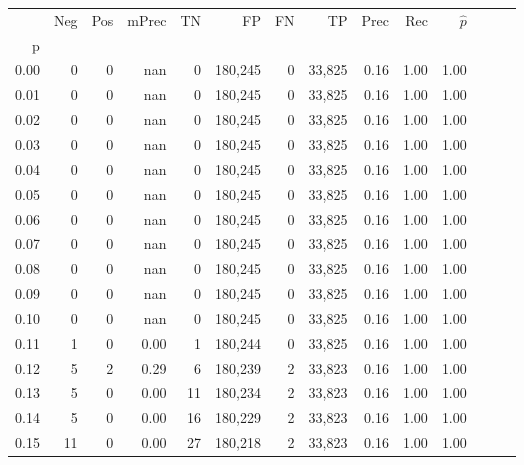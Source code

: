 \begin{tabular}{rrrrrrrrrrrrrr}
\toprule
{} &     Neg &    Pos & mPrec &       TN &       FP &      FN &      TP &  Prec &   Rec & $\hat{p}$ \\
p    &         &        &       &          &          &         &         &       &       &           \\
\midrule
0.00 &       0 &      0 &   nan &        0 &  180,245 &       0 &  33,825 &  0.16 &  1.00 &      1.00 \\
0.01 &       0 &      0 &   nan &        0 &  180,245 &       0 &  33,825 &  0.16 &  1.00 &      1.00 \\
0.02 &       0 &      0 &   nan &        0 &  180,245 &       0 &  33,825 &  0.16 &  1.00 &      1.00 \\
0.03 &       0 &      0 &   nan &        0 &  180,245 &       0 &  33,825 &  0.16 &  1.00 &      1.00 \\
0.04 &       0 &      0 &   nan &        0 &  180,245 &       0 &  33,825 &  0.16 &  1.00 &      1.00 \\
0.05 &       0 &      0 &   nan &        0 &  180,245 &       0 &  33,825 &  0.16 &  1.00 &      1.00 \\
0.06 &       0 &      0 &   nan &        0 &  180,245 &       0 &  33,825 &  0.16 &  1.00 &      1.00 \\
0.07 &       0 &      0 &   nan &        0 &  180,245 &       0 &  33,825 &  0.16 &  1.00 &      1.00 \\
0.08 &       0 &      0 &   nan &        0 &  180,245 &       0 &  33,825 &  0.16 &  1.00 &      1.00 \\
0.09 &       0 &      0 &   nan &        0 &  180,245 &       0 &  33,825 &  0.16 &  1.00 &      1.00 \\
0.10 &       0 &      0 &   nan &        0 &  180,245 &       0 &  33,825 &  0.16 &  1.00 &      1.00 \\
0.11 &       1 &      0 &  0.00 &        1 &  180,244 &       0 &  33,825 &  0.16 &  1.00 &      1.00 \\
0.12 &       5 &      2 &  0.29 &        6 &  180,239 &       2 &  33,823 &  0.16 &  1.00 &      1.00 \\
0.13 &       5 &      0 &  0.00 &       11 &  180,234 &       2 &  33,823 &  0.16 &  1.00 &      1.00 \\
0.14 &       5 &      0 &  0.00 &       16 &  180,229 &       2 &  33,823 &  0.16 &  1.00 &      1.00 \\
0.15 &      11 &      0 &  0.00 &       27 &  180,218 &       2 &  33,823 &  0.16 &  1.00 &      1.00 \\

\end{tabular}
